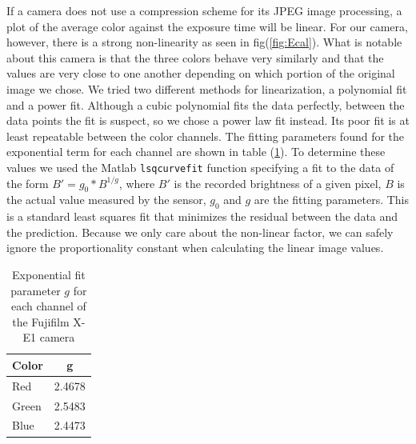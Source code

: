 \documentclass[a4paper]{article}
\begin{document}
 If a camera does not use a compression scheme for its JPEG image processing, a plot of the average color against  the exposure time will be linear.  For our camera, however, there is a strong non-linearity as seen in fig(\ref{fig:Ecal}).   What is notable about this camera is that the three colors behave very similarly and that the values are very close to one another depending on which portion of the original image we chose.  We tried two different methods for linearization, a polynomial fit and a power fit.  Although a cubic polynomial fits the data perfectly, between the data points the fit is suspect, so we chose a power law fit instead.  Its poor fit is at least repeatable between the color channels. The fitting parameters found for the exponential term for each channel are shown in table (\ref{tbl:gvals}). To determine these values we used the Matlab \verb+lsqcurvefit+ function specifying a fit to the data of the form $B' = g_0 * B^ {1/g}$, where $ B'$ is the recorded brightness of a given pixel, $ B$ is the actual value measured by the sensor,  $g_0$ and $g$  are the fitting parameters. This is a standard least squares fit that minimizes the residual between the data and the prediction.  Because we only care about the non-linear factor, we can safely ignore the proportionality constant when calculating the linear image values. 

\begin{table}[H]
    \begin{center}
        \begin{tabular}{l | c}
            Color & g\\
            \hline
            Red & 2.4678\\
            Green & 2.5483 \\
            Blue & 2.4473
    	\end{tabular}
    	\caption{Exponential fit parameter $g$ for each channel of the Fujifilm X-E1 camera}
    	\label{tbl:gvals}
    \end{center}
\end{table}
\end{document}

